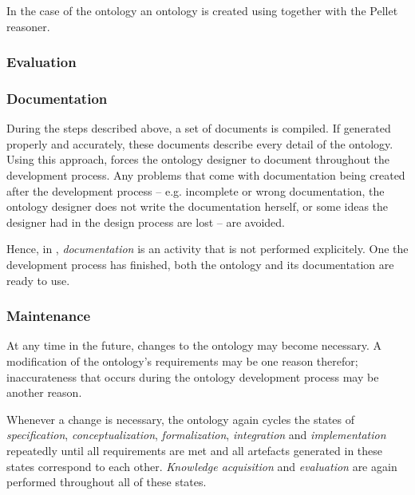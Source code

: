 In the case of the \thinkhomeweather ontology an  ontology is created using \protege together with the Pellet reasoner.

\subsubsection{Evaluation}


\subsubsection{Documentation}


During the steps described above, a set of documents is compiled. If generated properly and accurately, these documents describe every detail of the ontology. Using this approach, \methontology forces the ontology designer to document throughout the development process. Any problems that come with documentation being created after the development process -- e.g. incomplete or wrong documentation, the ontology designer does not write the documentation herself, or some ideas the designer had in the design process are lost -- are avoided.

Hence, in \methontology, \emph{documentation} is an activity that is not performed explicitely. One the development process has finished, both the ontology and its documentation are ready to use. 

\subsubsection{Maintenance}

At any time in the future, changes to the ontology may become necessary. A modification of the ontology's requirements may be one reason therefor; inaccurateness that occurs during the ontology development process may be another reason.

Whenever a change is necessary, the ontology again cycles the states of \emph{specification}, \emph{conceptualization}, \emph{formalization}, \emph{integration} and \emph{implementation} repeatedly until all requirements are met and all artefacts generated in these states correspond to each other. \emph{Knowledge acquisition} and \emph{evaluation} are again performed throughout all of these states.

